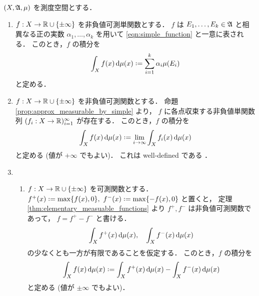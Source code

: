 \begin{definition}\label{def:Lebesgue_integral}
    $(X,\mathfrak{A},\mu)$ を測度空間とする．
    \begin{enumerate}
        \item $f:X\to\mathbb{R}\cup\{\pm\infty\}$ を非負値可測単関数とする．
            $f$ は $E_1,\ldots,E_k\in\mathfrak{A}$ と相異なる正の実数 $\alpha_1,\ldots,\alpha_k$ を用いて
            \eqref{eqn:simple_function} と一意に表される．
            このとき，$f$ の積分を
            \begin{align*}
                \int_Xf(x)\,\drm\mu(x)\defeq\sum_{i=1}^k\alpha_i\mu(E_i)
            \end{align*}
            と定める．
        \item $f:X\to\mathbb{R}\cup\{\pm\infty\}$ を非負値可測関数とする．
            命題 \ref{prop:approx_measurable_by_simple} より，
            $f$ に各点収束する非負値単関数列 $(f_i:X\to\mathbb{R})_{i=1}^\infty$ が存在する．
            このとき，$f$ の積分を
            \begin{align*}
                \int_Xf(x)\,\drm\mu(x)\defeq\lim_{i\to\infty}\int_Xf_i(x)\,\drm\mu(x)
            \end{align*}
            と定める (値が $+\infty$ でもよい)．
            これは well-defined である \cite[pp.74--77]{It63}．
        \item
            \begin{enumerate}
                \item
                    $f:X\to\mathbb{R}\cup\{\pm\infty\}$ を可測関数とする．
                    $f^+(x)\defeq\max\{f(x),0\},\ f^-(x)\defeq\max\{-f(x),0\}$ と置くと，
                    定理 \ref{thm:elementary_measuable_functions} より $f^+,f^-$ は非負値可測関数であって，
                    $f=f^+-f^-$ と書ける．
                    \begin{align}
                        \int_Xf^+(x)\,\mathrm{d}\mu(x),\quad
                        \int_Xf^-(x)\,\mathrm{d}\mu(x)
                        \label{eqn:f_pm_integral}
                    \end{align}
                    の少なくとも一方が有限であることを仮定する．
                    このとき，$f$ の積分を
                    \begin{align}
                        \int_Xf(x)\,\drm\mu(x)\defeq\int_Xf^+(x)\,\drm\mu(x)-\int_Xf^-(x)\,\drm\mu(x)
                        \label{eqn:f_integral}
                    \end{align}
                    と定める (値が $\pm\infty$ でもよい)．

\end{enumerate}
\end{enumerate}
\end{definition}
